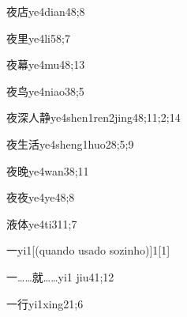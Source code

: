\begin{verbete}{夜店}{ye4dian4}{8;8}
\end{verbete}

\begin{verbete}{夜里}{ye4li5}{8;7}
\end{verbete}

\begin{verbete}{夜幕}{ye4mu4}{8;13}
\end{verbete}

\begin{verbete}{夜鸟}{ye4niao3}{8;5}
\end{verbete}

\begin{verbete}{夜深人静}{ye4shen1ren2jing4}{8;11;2;14}
\end{verbete}

\begin{verbete}{夜生活}{ye4sheng1huo2}{8;5;9}
\end{verbete}

\begin{verbete}{夜晚}{ye4wan3}{8;11}
\end{verbete}

\begin{verbete}{夜夜}{ye4ye4}{8;8}
\end{verbete}

\begin{verbete}{液体}{ye4ti3}{11;7}
\end{verbete}

\begin{verbete}{一}{yi1}[(quando usado sozinho)]{1}[1]
\end{verbete}

\begin{verbete}{一……就……}{yi1 jiu4}{1;12}
\end{verbete}

\begin{verbete}{一行}{yi1xing2}{1;6}
\end{verbete}

